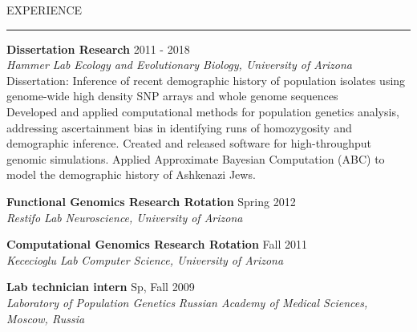 \documentclass{resume} %
\renewenvironment{rSection}[1]{
\sectionskip
\textcolor{RoyalPurple}{\MakeUppercase{#1}}
\sectionlineskip
\hrule
\begin{list}{}{
\setlength{\leftmargin}{1.5em}
}
\item[]
}{
\end{list}
}
\begin{document}
\begin{rSection}{Experience}
{\bf Dissertation Research} \hfill  2011 - 2018\\ 
{\em Hammer Lab} \hfill {\em Ecology and Evolutionary Biology, University of Arizona}\\
Dissertation: Inference of recent demographic history of population isolates using genome-wide high density SNP arrays and whole genome sequences \\
Developed and applied computational methods for population genetics analysis, addressing ascertainment bias in identifying runs of homozygosity and demographic inference. Created and released software for high-throughput genomic simulations. Applied Approximate Bayesian Computation (ABC) to model the demographic history of Ashkenazi Jews.

\newpage

{\bf Functional Genomics Research Rotation} \hfill  Spring 2012\\ 
{\em Restifo Lab} \hfill {\em Neuroscience, University of Arizona}

{\bf Computational Genomics Research Rotation} \hfill  Fall 2011\\ 
{\em Kececioglu Lab} \hfill {\em Computer Science, University of Arizona}

{\bf Lab technician intern} \hfill  Sp, Fall 2009\\ 
{\em Laboratory of Population Genetics} \hfill {\em Russian Academy of Medical Sciences, Moscow, Russia}

\end{rSection}


\end{document}
